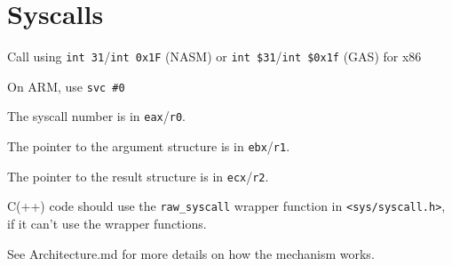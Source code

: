 \documentclass[12pt]{article}
\newcommand{\code}[1]{\colorbox{light-gray}{\texttt{#1}}}
\begin{document}
\section{Syscalls}
\begin{list}{}{}
\item Call using \code{int 31}/\code{int 0x1F} (NASM) or \code{int \$31}/\code{int \$0x1f} (GAS) for x86
\item On ARM, use \code{svc \#0}
\item The syscall number is in \code{eax}/\code{r0}.
\item The pointer to the argument structure is in \code{ebx}/\code{r1}.
\item The pointer to the result structure is in \code{ecx}/\code{r2}.
\item C(++) code should use the \code{raw\_syscall} wrapper function in \code{<sys/syscall.h>}, if it can't use the wrapper functions.
\item See Architecture.md for more details on how the mechanism works.
\end{list}
\end{document}
